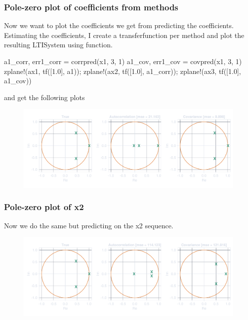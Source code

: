 \documentclass[compress,aspectratio=169]{beamer}
\begin{document}
\begin{frame}[fragile] %
    \frametitle{Pole-zero plot of coefficients from methods}

    Now we want to plot the coefficients we get from predicting the coefficients.
    Estimating the coefficients, I create a transferfunction per method and
    plot the resulting LTISystem using  function.
    \begin{jllisting}[gobble=8]
        a1_corr, err1_corr = corrpred(x1, 3, 1)
        a1_cov, err1_cov   = covpred(x1, 3, 1)
        zplane!(ax1, tf([1.0], a1)); zplane!(ax2, tf([1.0], a1_corr)); zplane!(ax3, tf([1.0], a1_cov))
    \end{jllisting}
    and get the following plots
    \begin{figure}
        \includegraphics[width=0.8\columnwidth]{"../2.pdf"}
    \end{figure}
\end{frame}

\begin{frame} %
    \frametitle{Pole-zero plot of x2}
    Now we do the same but predicting on the x2 sequence.
    
    \begin{figure}
        \includegraphics[width=\columnwidth]{"../3.pdf"}
    \end{figure}
\end{frame} %
\end{document}
